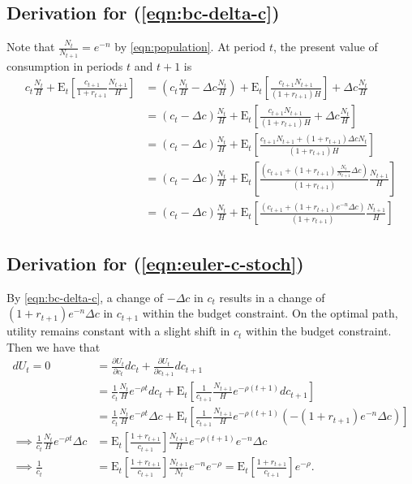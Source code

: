 \documentclass{article}
\newcommand{\Et}[1]{\mathrm{E}_t\left[#1\right]}
\begin{document}
    \subsection{Derivation for (\ref{eqn:bc-delta-c})}\label{app:bc-delta-c}
        Note that $\frac{N_t}{N_{t+1}} = e^{-n}$ by \eqref{eqn:population}. At period $t$, the present value of  consumption in periods $t$ and $t+1$ is
        \begin{align}
            c_{t}\frac{N_{t}}{H} + \Et{\frac{c_{t+1}}{1+r_{t+1}}\frac{N_{t+1}}{H}}
            &= \left(c_{t}\frac{N_{t}}{H} - \Delta c \frac{N_{t}}{H} \right)+ \Et{ \frac{c_{t+1}N_{t+1}}{(1+r_{t+1})H}} + \Delta c \frac{N_{t}}{H}
            \\
            &= (c_{t} - \Delta c)\frac{N_{t}}{H}
            + \Et{ \frac{c_{t+1}N_{t+1}}{(1+r_{t+1})H}+ \Delta c \frac{N_{t}}{H} }
            \\
            &= (c_{t} - \Delta c)\frac{N_{t}}{H}
            + \Et{\frac{c_{t+1} N_{t+1} + (1+r_{t+1}) \Delta c N_t}{(1+r_{t+1})H}}
            \\
            &= (c_{t} - \Delta c)\frac{N_{t}}{H}
            + \Et{\frac{\left( c_{t+1}
                + (1+r_{t+1}) \frac{N_t}{N_{t+1}} \Delta c \right)}{(1+r_{t+1})}\frac{N_{t+1}}{H}}
            \\
            &= (c_{t} - \Delta c)\frac{N_{t}}{H}
            + \Et{\frac{\left( c_{t+1}
                + (1+r_{t+1}) e^{-n} \Delta c \right)}{(1+r_{t+1})}\frac{N_{t+1}}{H}}
        \end{align}
    
    \subsection{Derivation for (\ref{eqn:euler-c-stoch})}\label{app:euler-c-stoch}
    
    By \eqref{eqn:bc-delta-c}, a change of $-\Delta c$ in  $c_t$ results in a change of $(1+r_{t+1}) e^{-n} \Delta c$ in $c_{t+1}$ within the budget constraint. On the optimal path, utility remains constant with a slight shift in $c_{t}$ within the budget constraint. Then we have that
    \begin{align}
            d U_t = 0
            &= \frac{\partial U_t}{\partial c_t} dc_t + \frac{\partial U_t}{\partial c_{t+1}} dc_{t+1}
            \\
            &= \frac{1}{c_t}\frac{N_t}{H}e^{-\rho t} dc_t + \Et{\frac{1}{c_{t+1}}\frac{N_{t+1}}{H}e^{-\rho (t+1)} dc_{t+1}}
            \\
            &= \frac{1}{c_t}\frac{N_t}{H}e^{-\rho t} \Delta c + \Et{\frac{1}{c_{t+1}}\frac{N_{t+1}}{H}e^{-\rho (t+1)}  (-(1+r_{t+1})e^{-n}  \Delta c)}
            \\ \implies
            \frac{1}{c_t} \frac{N_t}{H}e^{-\rho t} \Delta c
            &= \Et{\frac{1+r_{t+1}}{c_{t+1}}} \frac{N_{t+1}}{H}e^{-\rho (t+1)}e^{-n} \Delta c 
            \\ \implies
            \frac{1}{c_t}
            &= \Et{\frac{1+r_{t+1}}{c_{t+1}}} \frac{N_{t+1}}{N_t}e^{-n}e^{-\rho} = \Et{\frac{1+r_{t+1}}{c_{t+1}}} e^{-\rho}.
        \end{align}
    
\end{document}

